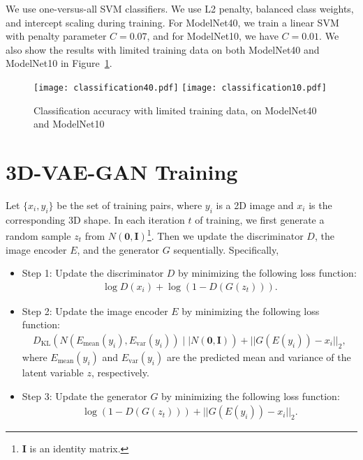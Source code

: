 \documentclass{article}
\newcommand{\fig}[1]{Figure~\ref{#1}}
\newcommand{\vaemodel}{3D-VAE-GAN\xspace}
\begin{document}
We use one-versus-all SVM classifiers. We use L2 penalty, balanced class weights, and intercept scaling during training. For ModelNet40, we train a linear SVM with penalty parameter $C=0.07$, and for ModelNet10, we have $C=0.01$. We also show the results with limited training data on both ModelNet40 and ModelNet10 in \fig{fig:classification_detail}.

\begin{figure}[h]
\centering
\texttt{[image: classification40.pdf]}
\qquad
\texttt{[image: classification10.pdf]} 
\caption{Classification accuracy with limited training data, on ModelNet40 and ModelNet10}
\label{fig:classification_detail}
\end{figure}

\section{\vaemodel Training}

Let $\{x_i,y_i\}$ be the set of training pairs, where $y_i$ is a 2D image and $x_i$ is the corresponding 3D shape. In each iteration $t$ of training, we first generate a random sample $z_t$ from $N(\mathbf{0},\mathbf{I})$\footnote{$\mathbf{I}$ is an identity matrix.}. Then we update the discriminator $D$, the image encoder $E$, and the generator $G$ sequentially. Specifically,

\begin{itemize}
\item Step 1: Update the discriminator $D$ by minimizing the following loss function:
\begin{align}
\log D(x_i) + \log (1-D(G(z_t))).
\end{align}

\item Step 2: Update the image encoder $E$ by minimizing the following loss function:
\begin{align}
D_{\text{KL}}\left(N(E_\text{mean}(y_i),E_\text{var}(y_i))\mid\mid N(\mathbf{0},\mathbf{I})\right) + ||G(E(y_i)) - x_i||_2,
\end{align}
where $E_\text{mean}(y_i)$ and $E_\text{var}(y_i) $ are the predicted mean and variance of the latent variable $z$, respectively.

\item Step 3: Update the generator $G$ by minimizing the following loss function:
\begin{align}
\log (1-D(G(z_t))) + ||G(E(y_i)) - x_i||_2.
\end{align}
\end{itemize}
\end{document}
